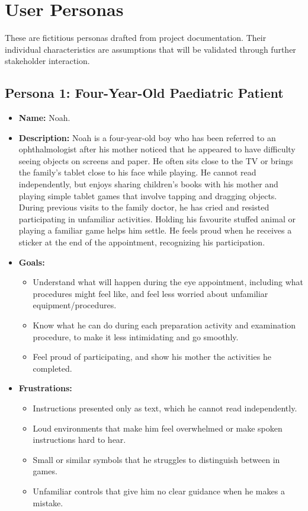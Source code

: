 \documentclass[10pt]{article}
\begin{document}
\newpage
\section{User Personas}
\label{sec_Personas}
These are fictitious personas drafted from project documentation.
Their individual characteristics are assumptions that will be validated through further stakeholder interaction.

\subsection{Persona 1: Four-Year-Old Paediatric Patient}
\begin{itemize}
\item \textbf{Name:} Noah.

\item \textbf{Description:} Noah is a four-year-old boy who has been referred
to an ophthalmologist after his mother noticed that he appeared to have
difficulty seeing objects on screens and paper. He often sits close to the
TV or brings the family's tablet close to his face while playing.
He cannot read independently, but enjoys sharing children's books with his
mother and playing simple tablet games that involve tapping and
dragging objects. During previous visits to the family doctor, he has cried
and resisted participating in unfamiliar activities. Holding his favourite
stuffed animal or playing a familiar game helps him settle.
He feels proud when he receives a sticker at the end of the appointment,
recognizing his participation.

\item \textbf{Goals:}
\begin{itemize}
    \item Understand what will happen during the eye appointment, including what
    procedures might feel like, and feel less worried about unfamiliar equipment/procedures.
    \item Know what he can do during each preparation activity and examination
    procedure, to make it less intimidating and go smoothly.
    \item Feel proud of participating, and show his mother the activities he completed.
\end{itemize}

\item \textbf{Frustrations:}
\begin{itemize}
    \item Instructions presented only as text, which he cannot read independently.
    \item Loud environments that make him feel overwhelmed or make spoken
    instructions hard to hear.
    \item Small or similar symbols that he struggles to distinguish between
    in games.
    \item Unfamiliar controls that give him no clear guidance
    when he makes a mistake.
\end{itemize}


\end{itemize}
\end{document}

